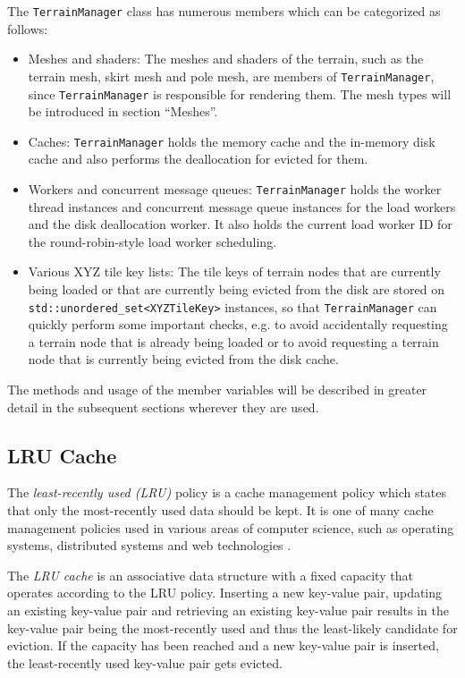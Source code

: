 The \texttt{TerrainManager} class has numerous members which can be categorized as follows:
\begin{itemize}
  \item Meshes and shaders: The meshes and shaders of the terrain, such as the terrain mesh, skirt mesh and pole mesh,
        are members of \texttt{TerrainManager}, since \texttt{TerrainManager} is responsible for rendering them.
        The mesh types will be introduced in section ``Meshes''.
  \item Caches: \texttt{TerrainManager} holds the memory cache and the in-memory disk cache and also 
                performs the deallocation for evicted for them.
  \item Workers and concurrent message queues: \texttt{TerrainManager} holds the worker thread instances 
        and concurrent message queue instances for the load workers and the disk deallocation worker.
        It also holds the current load worker ID for the round-robin-style load worker scheduling.
  \item Various XYZ tile key lists: The tile keys of terrain nodes that are currently being loaded or that are currently 
        being evicted from the disk are stored on \texttt{std::unordered\_set<XYZTileKey>} instances,
        so that \texttt{TerrainManager} can quickly perform some important checks, e.g. 
        to avoid accidentally requesting a terrain node that is already being loaded or 
        to avoid requesting a terrain node that is currently being evicted from the disk cache.
\end{itemize}

The methods and usage of the member variables will be described in greater detail 
in the subsequent sections wherever they are used.

\subsection{LRU Cache}
The \textit{least-recently used (LRU)} policy is a cache management policy 
which states that only the most-recently used data should be kept.
It is one of many cache management policies used in various areas of 
computer science, such as operating systems, distributed systems and 
web technologies \cite{redislru}.

The \textit{LRU cache} is an associative data structure with a fixed capacity
that operates according to the LRU policy.
Inserting a new key-value pair, updating an existing key-value pair and 
retrieving an existing key-value pair results in the key-value pair 
being the most-recently used and thus the least-likely candidate for eviction.
If the capacity has been reached and a new key-value pair is inserted, 
the least-recently used key-value pair gets evicted.

